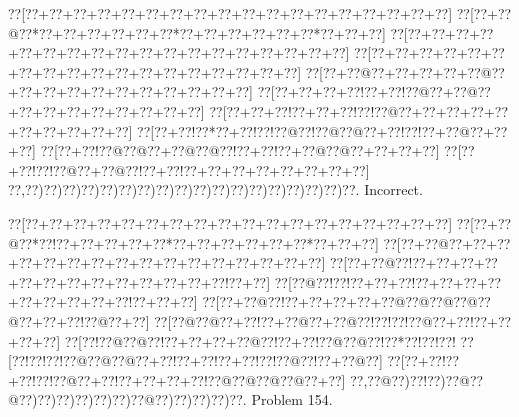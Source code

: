 \documentclass[a5paper]{article}
\begin{document}
\begin{center}
{\goo
\0??[\0??+\0??+\0??+\0??+\0??+\0??+\0??+\0??+\0??+\0??+\0??+\0??+\0??+\0??+\0??+\0??+\0??+\0??]
\0??[\0??+\0??@\0??*\0??+\0??+\0??+\0??+\0??+\0??*\0??+\0??+\0??+\0??+\0??+\0??*\0??+\0??+\0??]
\0??[\0??+\0??+\0??+\0??+\0??+\0??+\0??+\0??+\0??+\0??+\0??+\0??+\0??+\0??+\0??+\0??+\0??+\0??]
\0??[\0??+\0??+\0??+\0??+\0??+\0??+\0??+\0??+\0??+\0??+\0??+\0??+\0??+\0??+\0??+\0??+\0??+\0??]
\0??[\0??+\0??@\0??+\0??+\0??+\0??+\0??@\0??+\0??+\0??+\0??+\0??+\0??+\0??+\0??+\0??+\0??+\0??]
\0??[\0??+\0??+\0??+\0??!\0??+\0??!\0??@\0??+\0??@\0??+\0??+\0??+\0??+\0??+\0??+\0??+\0??+\0??]
\0??[\0??+\0??+\0??!\0??+\0??+\0??!\0??!\0??@\0??+\0??+\0??+\0??+\0??+\0??+\0??+\0??+\0??+\0??]
\0??[\0??+\0??!\0??*\0??+\0??!\0??!\0??@\0??!\0??@\0??@\0??+\0??!\0??!\0??+\0??@\0??+\0??+\0??]
\0??[\0??+\0??!\0??@\0??@\0??+\0??@\0??@\0??!\0??+\0??!\0??+\0??@\0??@\0??+\0??+\0??+\0??]
\0??[\0??+\0??!\0??!\0??@\0??+\0??@\0??!\0??+\0??!\0??+\0??+\0??+\0??+\0??+\0??+\0??+\0??]
\0??,\0??)\0??)\0??)\0??)\0??)\0??)\0??)\0??)\0??)\0??)\0??)\0??)\0??)\0??)\0??)\0??)\0??)\0??.
}
Incorrect. 

\end{center}
\newpage
\begin{center}
{\goo
\0??[\0??+\0??+\0??+\0??+\0??+\0??+\0??+\0??+\0??+\0??+\0??+\0??+\0??+\0??+\0??+\0??+\0??+\0??]
\0??[\0??+\0??@\0??*\0??!\0??+\0??+\0??+\0??+\0??*\0??+\0??+\0??+\0??+\0??+\0??*\0??+\0??+\0??]
\0??[\0??+\0??@\0??+\0??+\0??+\0??+\0??+\0??+\0??+\0??+\0??+\0??+\0??+\0??+\0??+\0??+\0??+\0??]
\0??[\0??+\0??@\0??!\0??+\0??+\0??+\0??+\0??+\0??+\0??+\0??+\0??+\0??+\0??+\0??+\0??!\0??+\0??]
\0??[\0??@\0??!\0??!\0??+\0??+\0??!\0??+\0??+\0??+\0??+\0??+\0??+\0??+\0??+\0??!\0??+\0??+\0??]
\0??[\0??+\0??@\0??!\0??+\0??+\0??+\0??+\0??@\0??@\0??@\0??@\0??@\0??+\0??+\0??!\0??@\0??+\0??]
\0??[\0??@\0??@\0??+\0??!\0??+\0??@\0??+\0??@\0??!\0??!\0??!\0??@\0??+\0??!\0??+\0??+\0??+\0??]
\0??[\0??!\0??@\0??@\0??!\0??+\0??+\0??+\0??@\0??!\0??+\0??!\0??@\0??@\0??!\0??*\0??!\0??!\0??!
\0??[\0??!\0??!\0??!\0??@\0??@\0??@\0??+\0??!\0??+\0??!\0??+\0??!\0??!\0??@\0??!\0??+\0??@\0??]
\0??[\0??+\0??!\0??+\0??!\0??!\0??@\0??+\0??!\0??+\0??+\0??+\0??!\0??@\0??@\0??@\0??@\0??+\0??]
\0??,\0??@\0??)\0??!\0??)\0??@\0??@\0??)\0??)\0??)\0??)\0??)\0??)\0??@\0??)\0??)\0??)\0??)\0??.
}
Problem 154.

\end{center}
\end{document}
